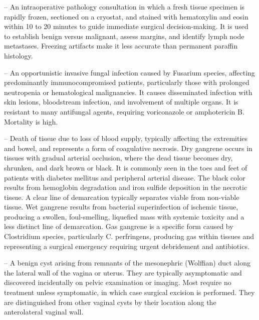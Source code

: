 -- An intraoperative pathology consultation in which a fresh tissue specimen is rapidly frozen, sectioned on a cryostat, and stained with hematoxylin and eosin within 10 to 20 minutes to guide immediate surgical decision-making. It is used to establish benign versus malignant, assess margins, and identify lymph node metastases. Freezing artifacts make it less accurate than permanent paraffin histology.

-- An opportunistic invasive fungal infection caused by Fusarium species, affecting predominantly immunocompromised patients, particularly those with prolonged neutropenia or hematological malignancies. It causes disseminated infection with skin lesions, bloodstream infection, and involvement of multiple organs. It is resistant to many antifungal agents, requiring voriconazole or amphotericin B. Mortality is high.

-- Death of tissue due to loss of blood supply, typically affecting the extremities and bowel, and represents a form of coagulative necrosis. Dry gangrene occurs in tissues with gradual arterial occlusion, where the dead tissue becomes dry, shrunken, and dark brown or black. It is commonly seen in the toes and feet of patients with diabetes mellitus and peripheral arterial disease. The black color results from hemoglobin degradation and iron sulfide deposition in the necrotic tissue. A clear line of demarcation typically separates viable from non-viable tissue. Wet gangrene results from bacterial superinfection of ischemic tissue, producing a swollen, foul-smelling, liquefied mass with systemic toxicity and a less distinct line of demarcation. Gas gangrene is a specific form caused by Clostridium species, particularly C. perfringens, producing gas within tissues and representing a surgical emergency requiring urgent debridement and antibiotics.

-- A benign cyst arising from remnants of the mesonephric (Wolffian) duct along the lateral wall of the vagina or uterus. They are typically asymptomatic and discovered incidentally on pelvic examination or imaging. Most require no treatment unless symptomatic, in which case surgical excision is performed. They are distinguished from other vaginal cysts by their location along the anterolateral vaginal wall.


